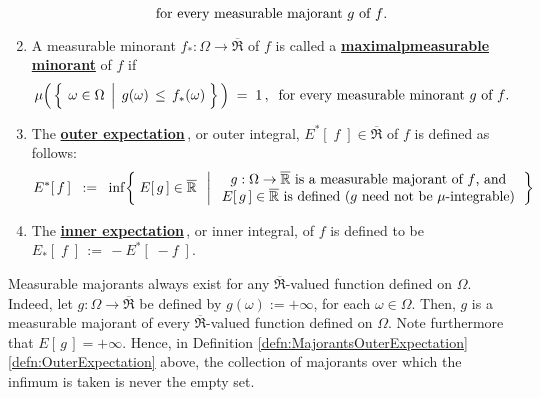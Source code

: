 \begin{definition}
\begin{enumerate}
\begin{equation*}
	\textnormal{for every measurable majorant $g$ of $f$}.
	\end{equation*}	
\item
	A measurable minorant $f_{*}:\Omega\longrightarrow\overline{\Re}$ of $f$
	is called a \underline{\textbf{maximal{\color{white}p}measurable minorant}} of $f$ if
	\begin{equation*}
	\mu\!\left(\,
		\left\{\;\left.\omega\overset{{\color{white}.}}{\in}\Omega\;\,\right\vert\; g(\omega) \,\leq\, f_{*}(\omega) \;\right\}
		\,\right)
	\;=\;1\,,\;\;
	\textnormal{for every measurable minorant $g$ of $f$}.
	\end{equation*}	
\item\label{defn:OuterExpectation}
	The \underline{\textbf{outer expectation}}\,, or outer integral,
	$E^{*}\!\left[\;f\;\right] \in \overline{\Re}$
	of $f$ is defined as follows:
	\begin{equation*}
	E^{*}\!\left[\,f\,\right]
	\;\; := \;\;
		\inf\!\left\{\;
			E\!\left[\,g\,\right] \in \overline{\Re}
			\;\;\left\vert\;
			\begin{array}{c}
				\textnormal{$g:\Omega\rightarrow\overline{\Re}$ is a measurable majorant of $f$, and}
				\\
				\textnormal{$E\!\left[\,g\,\right] \in \overline{\Re}$ is defined ($g$ need not be $\mu$-integrable)}
			\end{array}
			\right.
			\right\}
	\end{equation*}
\item
	The \underline{\textbf{inner expectation}}\,, or inner integral,
	of $f$ is defined to be
	$E_{*}\!\left[\;f\;\right] \, := \, - E^{*}\!\left[\;- f\;\right]$.
\end{enumerate}
\end{definition}

\begin{remark}
\mbox{}\vskip 0.1cm
\noindent
Measurable majorants always exist for any $\overline{\Re}$-valued function defined on $\Omega$.
Indeed, let $g : \Omega \longrightarrow \overline{\Re}$ be defined by $g(\omega) := +\infty$, for each $\omega \in \Omega$.
Then, $g$ is a measurable majorant of every $\overline{\Re}$-valued function defined on $\Omega$.
Note furthermore that $E\!\left[\,g\,\right] = +\infty$.
Hence, in Definition \ref{defn:MajorantsOuterExpectation} \eqref{defn:OuterExpectation} above,
the collection of majorants over which the infimum is taken is never the empty set.
\end{remark}


